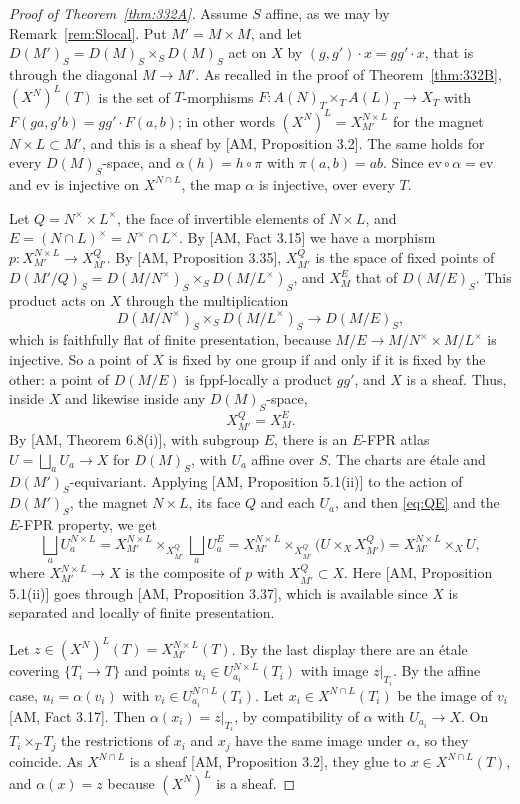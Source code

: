 \begin{proof}[Proof of Theorem~\ref{thm:332A}]
Assume $S$ affine, as we may by Remark~\ref{rem:Slocal}. Put $M'=M\times M$, and let $D(M')_S=D(M)_S\times_S D(M)_S$ act on $X$ by $(g,g')\cdot x=gg'\cdot x$, that is through the diagonal $M\to M'$. As recalled in the proof of Theorem~\ref{thm:332B}, $(X^{N})^{L}(T)$ is the set of $T$-morphisms $F\colon A(N)_T\times_T A(L)_T\to X_T$ with $F(ga,g'b)=gg'\cdot F(a,b)$; in other words $(X^{N})^{L}=X^{N\times L}_{M'}$ for the magnet $N\times L\subset M'$, and this is a sheaf by [AM, Proposition 3.2]. The same holds for every $D(M)_S$-space, and $\alpha(h)=h\circ\pi$ with $\pi(a,b)=ab$. Since $\mathrm{ev}\circ\alpha=\mathrm{ev}$ and $\mathrm{ev}$ is injective on $X^{N\cap L}$, the map $\alpha$ is injective, over every $T$.

Let $Q=N^{\times}\times L^{\times}$, the face of invertible elements of $N\times L$, and $E=(N\cap L)^{\times}=N^{\times}\cap L^{\times}$. By [AM, Fact 3.15] we have a morphism $p\colon X^{N\times L}_{M'}\to X^{Q}_{M'}$. By [AM, Proposition 3.35], $X^{Q}_{M'}$ is the space of fixed points of $D(M'/Q)_S=D(M/N^{\times})_S\times_S D(M/L^{\times})_S$, and $X^{E}_{M}$ that of $D(M/E)_S$. This product acts on $X$ through the multiplication
\[
D(M/N^{\times})_S\times_S D(M/L^{\times})_S\to D(M/E)_S,
\]
which is faithfully flat of finite presentation, because $M/E\to M/N^{\times}\times M/L^{\times}$ is injective. So a point of $X$ is fixed by one group if and only if it is fixed by the other: a point of $D(M/E)$ is fppf-locally a product $gg'$, and $X$ is a sheaf. Thus, inside $X$ and likewise inside any $D(M)_S$-space,
\begin{equation}\label{eq:QE}
X^{Q}_{M'}=X^{E}_{M}.
\end{equation}
By [AM, Theorem 6.8(i)], with subgroup $E$, there is an $E$-FPR atlas $U=\bigsqcup_a U_a\to X$ for $D(M)_S$, with $U_a$ affine over $S$. The charts are étale and $D(M')_S$-equivariant. Applying [AM, Proposition 5.1(ii)] to the action of $D(M')_S$, the magnet $N\times L$, its face $Q$ and each $U_a$, and then \eqref{eq:QE} and the $E$-FPR property, we get
\[
\bigsqcup_a U_a^{N\times L}=X^{N\times L}_{M'}\times_{X^{Q}_{M'}}\bigsqcup_a U_a^{E}=X^{N\times L}_{M'}\times_{X^{Q}_{M'}}\big(U\times_X X^{Q}_{M'}\big)=X^{N\times L}_{M'}\times_X U,
\]
where $X^{N\times L}_{M'}\to X$ is the composite of $p$ with $X^{Q}_{M'}\subset X$. Here [AM, Proposition 5.1(ii)] goes through [AM, Proposition 3.37], which is available since $X$ is separated and locally of finite presentation.

Let $z\in(X^{N})^{L}(T)=X^{N\times L}_{M'}(T)$. By the last display there are an étale covering $\{T_i\to T\}$ and points $u_i\in U_{a_i}^{N\times L}(T_i)$ with image $z|_{T_i}$. By the affine case, $u_i=\alpha(v_i)$ with $v_i\in U_{a_i}^{N\cap L}(T_i)$. Let $x_i\in X^{N\cap L}(T_i)$ be the image of $v_i$ [AM, Fact 3.17]. Then $\alpha(x_i)=z|_{T_i}$, by compatibility of $\alpha$ with $U_{a_i}\to X$. On $T_i\times_T T_j$ the restrictions of $x_i$ and $x_j$ have the same image under $\alpha$, so they coincide. As $X^{N\cap L}$ is a sheaf [AM, Proposition 3.2], they glue to $x\in X^{N\cap L}(T)$, and $\alpha(x)=z$ because $(X^{N})^{L}$ is a sheaf.
\end{proof}

